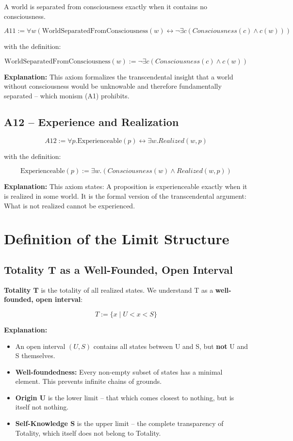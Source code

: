 \documentclass[
]{article}
\begin{document}
A world is separated from consciousness exactly when it contains no consciousness.

\[
\boxed{A11 := \forall w \left( \text{WorldSeparatedFromConsciousness}(w) \leftrightarrow \neg \exists c (Consciousness(c) \land c(w)) \right)}
\]

with the definition:

\[
\boxed{\text{WorldSeparatedFromConsciousness}(w) := \neg \exists c (Consciousness(c) \land c(w))}
\]

\textbf{Explanation:} This axiom formalizes the transcendental insight that a world without consciousness would be unknowable and therefore fundamentally separated – which monism (A1) prohibits.

\subsection{A12 – Experience and Realization}\label{a12-experience-and-realization}

\[
\boxed{A12 := \forall p. \text{Experienceable}(p) \leftrightarrow \exists w. Realized(w, p)}
\]

with the definition:

\[
\boxed{\text{Experienceable}(p) := \exists w. (Consciousness(w) \land Realized(w, p))}
\]

\textbf{Explanation:} This axiom states: A proposition is experienceable exactly when it is realized in some world. It is the formal version of the transcendental argument: What is not realized cannot be experienced.

\section{Definition of the Limit Structure}\label{definition-of-the-limit-structure}

\subsection{Totality T as a Well-Founded, Open Interval}\label{totality-t-as-a-well-founded-open-interval}

\textbf{Totality T} is the totality of all realized states. We understand T as a \textbf{well-founded, open interval}:

\[
\boxed{T := \{ x \mid U < x < S \}}
\]

\textbf{Explanation:}
\begin{itemize}
\item An open interval \((U, S)\) contains all states between U and S, but \textbf{not} U and S themselves.
\item \textbf{Well-foundedness:} Every non-empty subset of states has a minimal element. This prevents infinite chains of grounds.
\item \textbf{Origin U} is the lower limit – that which comes closest to nothing, but is itself not nothing.
\item \textbf{Self-Knowledge S} is the upper limit – the complete transparency of Totality, which itself does not belong to Totality.
\end{itemize}
\end{document}
